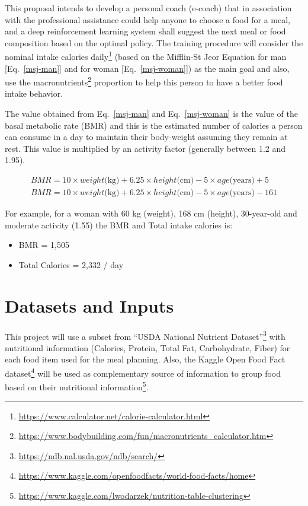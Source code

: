 \documentclass{article}
\begin{document}
This proposal intends to develop a personal coach (e-coach) that in association with the professional 
assistance could help anyone to choose a food for a meal, and a deep reinforcement learning system 
shall suggest the next meal or food composition based on the optimal policy. The training procedure 
will consider the nominal intake calories daily\footnote{\url{https://www.calculator.net/calorie-calculator.html}}  
(based on the Mifflin-St Jeor Equation for man [Eq.~\ref{msj-man}] and for woman [Eq.~\ref{msj-woman}]) as the 
main goal and also, use the macronutrients\footnote{\url{https://www.bodybuilding.com/fun/macronutrients_calculator.htm}}  
proportion to help this person to have a better food intake behavior.

The value obtained from Eq.~\ref{msj-man} and Eq.~\ref{msj-woman} is the value of the basal metabolic rate (BMR)
and this is the estimated number of calories a person can consume in a day to maintain their body-weight assuming they 
remain at rest. This value is multiplied by an activity factor (generally between 1.2 and 1.95).

\begin{eqnarray}
    BMR = 10 \times weight\mbox{(kg)} + 6.25 \times height\mbox{(cm)} - 5 \times age\mbox{(years)} + 5 \label{msj-man}\\
    BMR = 10 \times weight\mbox{(kg)} + 6.25 \times height\mbox{(cm)} - 5 \times age\mbox{(years)} -161 \label{msj-woman}
\end{eqnarray}

For example, for a woman with 60 kg (weight), 168 cm (height), 30-year-old and moderate activity (1.55) the BMR and 
Total intake calories is:

\begin{itemize}
    \item BMR = 1,505
    \item Total Calories = 2,332 / day
\end{itemize}

\section{Datasets and Inputs}

This project will use a subset from ``USDA National Nutrient Dataset''\footnote{\url{https://ndb.nal.usda.gov/ndb/search/}}
with nutritional information (Calories, Protein, Total Fat, Carbohydrate, Fiber) 
for each food item used for the meal planning. Also, the Kaggle Open Food Fact dataset\footnote{\url{https://www.kaggle.com/openfoodfacts/world-food-facts/home}}  
will be used as complementary source of information to group food based on their 
nutritional information\footnote{\url{https://www.kaggle.com/lwodarzek/nutrition-table-clustering}}. 
\end{document}
